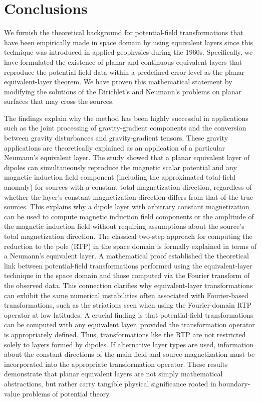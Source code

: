 \section{Conclusions}
\label{sec:conclusions}

We furnish the theoretical background for potential-field transformations
that have been empirically made in space domain by using equivalent layers since 
this technique was introduced in applied geophysics during the 1960s.
Specifically, we have formulated the existence of planar and continuous equivalent layers that 
reproduce the potential-field data within a predefined error level
as the planar equivalent-layer theorem.
We have proven this mathematical statement by modifying the solutions of the 
Dirichlet's and Neumann's problems on planar surfaces that may cross the sources.

The findings explain why the method has been highly successful in applications such as 
the joint processing of gravity-gradient components and the conversion between gravity 
disturbances and gravity-gradient tensors. These gravity applications are theoretically 
explained as an application of a particular Neumann’s equivalent layer.
The study showed that a planar equivalent layer of dipoles can simultaneously reproduce 
the magnetic scalar potential and any magnetic induction field component (including the 
approximated total-field anomaly) for sources with a constant total-magnetization 
direction, regardless of whether the layer's constant magnetization direction 
differs from that of the true sources. This explains why a dipole layer with arbitrary 
constant magnetization can be used to compute magnetic induction field components or 
the amplitude of the magnetic induction field without requiring assumptions about the 
source's total magnetization direction.
The classical two-step approach for computing the reduction to 
the pole (RTP) in the space domain is formally explained in terms of a Neumann’s 
equivalent layer.
A mathematical proof established the theoretical link between potential-field 
transformations performed using the equivalent-layer technique in the space domain and 
those computed via the Fourier transform of the observed data. This connection 
clarifies why equivalent-layer transformations can exhibit the same numerical 
instabilities often associated with Fourier-based transformations, such as the 
striations seen when using the Fourier-domain RTP operator at low latitudes.
A crucial finding is that potential-field transformations can be computed with any 
equivalent layer, provided the transformation operator is appropriately defined. Thus, 
transformations like the RTP are not restricted solely to layers formed by dipoles. If 
alternative layer types are used, information about the constant directions of the main 
field and source magnetization must be incorporated into the appropriate transformation 
operator.
These results demonstrate that planar equivalent layers are not simply mathematical 
abstractions, but rather carry tangible physical significance rooted in 
boundary-value problems of potential theory.

